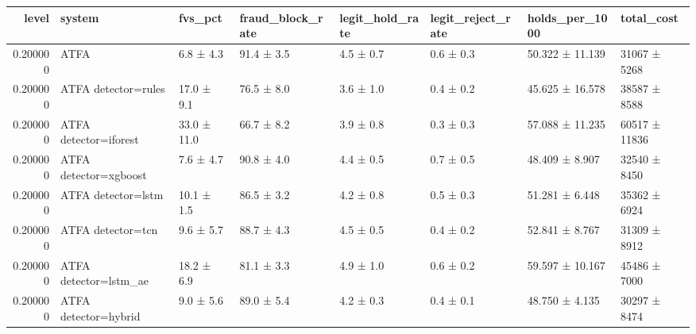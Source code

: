 \begin{tabular}{rlllllll}
\toprule
level & system & fvs\_pct & fraud\_block\_rate & legit\_hold\_rate & legit\_reject\_rate & holds\_per\_1000 & total\_cost \\
\midrule
0.200000 & ATFA & 6.8 ± 4.3 & 91.4 ± 3.5 & 4.5 ± 0.7 & 0.6 ± 0.3 & 50.322 ± 11.139 & 31067 ± 5268 \\
0.200000 & ATFA detector=rules & 17.0 ± 9.1 & 76.5 ± 8.0 & 3.6 ± 1.0 & 0.4 ± 0.2 & 45.625 ± 16.578 & 38587 ± 8588 \\
0.200000 & ATFA detector=iforest & 33.0 ± 11.0 & 66.7 ± 8.2 & 3.9 ± 0.8 & 0.3 ± 0.3 & 57.088 ± 11.235 & 60517 ± 11836 \\
0.200000 & ATFA detector=xgboost & 7.6 ± 4.7 & 90.8 ± 4.0 & 4.4 ± 0.5 & 0.7 ± 0.5 & 48.409 ± 8.907 & 32540 ± 8450 \\
0.200000 & ATFA detector=lstm & 10.1 ± 1.5 & 86.5 ± 3.2 & 4.2 ± 0.8 & 0.5 ± 0.3 & 51.281 ± 6.448 & 35362 ± 6924 \\
0.200000 & ATFA detector=tcn & 9.6 ± 5.7 & 88.7 ± 4.3 & 4.5 ± 0.5 & 0.4 ± 0.2 & 52.841 ± 8.767 & 31309 ± 8912 \\
0.200000 & ATFA detector=lstm\_ae & 18.2 ± 6.9 & 81.1 ± 3.3 & 4.9 ± 1.0 & 0.6 ± 0.2 & 59.597 ± 10.167 & 45486 ± 7000 \\
0.200000 & ATFA detector=hybrid & 9.0 ± 5.6 & 89.0 ± 5.4 & 4.2 ± 0.3 & 0.4 ± 0.1 & 48.750 ± 4.135 & 30297 ± 8474 \\
\bottomrule
\end{tabular}
